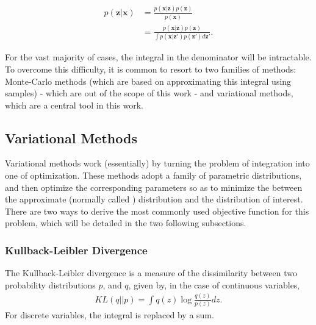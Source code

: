 \begin{align}
    p(\bm{z}|\bm{x}) &= \frac{p(\bm{x}|\bm{z})p(\bm{z})}{p(\bm{x})} \\
                     &= \frac{p(\bm{x}|\bm{z})p(\bm{z})}{\int p(\bm{x}|\bm{z'})p(\bm{z'}) d\bm{z'}}.
\end{align}

For the vast majority of cases, the integral in the denominator will be
intractable. To overcome this difficulty, it is common to resort to two families
of methods: Monte-Carlo methods (which are based on approximating this integral
using samples) - which are out of the scope of this work - and variational methods,
which are a central tool in this work.
%
%

\subsection{Variational Methods}
\label{subsection:variational}
Variational methods work (essentially) by turning the problem of integration into one of
optimization. These methods adopt a family of parametric distributions, and then
optimize the corresponding parameters so as to minimize the  between the approximate
(normally called ) distribution and the distribution of interest.
There are two ways to derive the most commonly used objective function for
this problem, which will be detailed in the two following subsections.

\subsubsection{Kullback-Leibler Divergence}
\label{subsubsection:kldiv}

The Kullback-Leibler divergence is a measure of the dissimilarity between two probability
distributions $p$, and $q$, given by, in the case of continuous variables,
\begin{align}
    KL(q||p) = \int q(z) \log\frac{q(z)}{p(z)} dz .
\end{align} For discrete variables, the integral is replaced by a sum.

